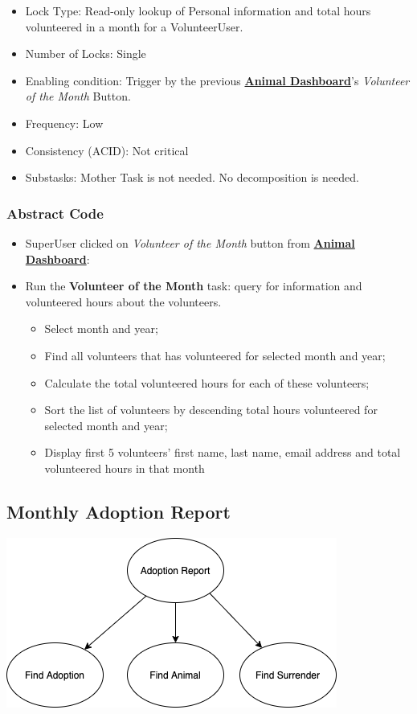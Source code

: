 \documentclass[a4paper]{article}
\begin{document}
\begin{itemize}
	\item Lock Type: Read-only lookup of Personal information and total hours volunteered in a month for a VolunteerUser.
	\item Number of Locks: Single
	\item Enabling condition: Trigger by the previous \underline{\textbf{Animal Dashboard}}'s \textit{Volunteer of the Month} Button.
	\item Frequency: Low
	\item Consistency (ACID): Not critical
	\item Substasks: Mother Task is not needed. No decomposition is needed.
\end{itemize}

\subsubsection{Abstract Code}

\begin{itemize}
	\item SuperUser clicked on \textit{Volunteer of the Month} button from \underline{\textbf{Animal Dashboard}}:
	\item Run the \textbf{Volunteer of the Month} task: query for information and volunteered hours about the volunteers.
	\begin{itemize}
		\item Select month and year;
		\item Find all volunteers that has volunteered for selected month and year;
		\item Calculate the total volunteered hours for each of these volunteers;
		\item Sort the list of volunteers by descending total hours volunteered for selected month and year;
		\item Display first 5 volunteers' first name, last name, email address and total volunteered hours in that month
	\end{itemize}
\end{itemize}




\hypertarget{monthly_adoption_report}{\subsection{Monthly Adoption Report}}
\includegraphics[scale = 0.6]{adoption_report.png}
\end{document}
